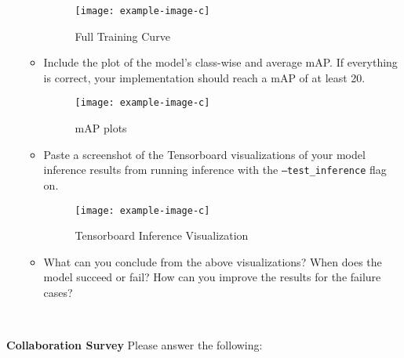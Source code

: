 \documentclass[11pt,addpoints,answers]{exam}
\numberwithin{equation}{section} %
\numberwithin{figure}{section} %
\numberwithin{table}{section} %
\begin{document}
\begin{itemize}
\begin{itemize}
        \begin{figure}[H]
            \centering
            \texttt{[image: example-image-c]}
            \caption{Full Training Curve}
            \label{fig:full_loss_plot}
        \end{figure}

        \item Include the plot of the model's class-wise and average mAP. If everything is correct, your implementation should reach a mAP of at least 20.

        \begin{figure}[H]
            \centering
            \texttt{[image: example-image-c]}
            \caption{mAP plots}
            \label{fig:final_mAP}
        \end{figure}
        
        \item Paste a screenshot of the Tensorboard visualizations of your model inference results from running inference with the \texttt{--test\_inference} flag on.

        \begin{figure}[H]
            \centering
            \texttt{[image: example-image-c]}
            \caption{Tensorboard Inference Visualization}
            \label{fig:inference_results}
        \end{figure}

        \item What can you conclude from the above visualizations? When does the model succeed or fail? How can you improve the results for the failure cases?

        \begin{solution}
        \\
        \end{solution}

    \end{itemize}
\end{itemize}

\clearpage

\textbf{Collaboration Survey} Please answer the following:
\end{document}
